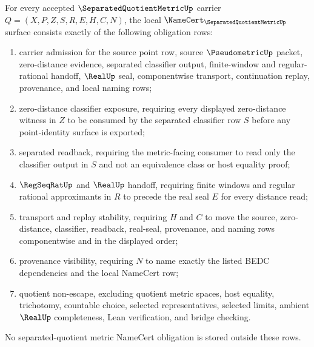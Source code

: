 \begin{theorem}
\label{thm:separated-quotient-metric-namecert-obligations}
For every accepted $\SeparatedQuotientMetricUp$ carrier $Q=(X,P,Z,S,R,E,H,C,N)$, the local $\NameCert_{\SeparatedQuotientMetricUp}$ surface consists exactly of the following obligation rows:
\begin{enumerate}
\item carrier admission for the source point row, source $\PseudometricUp$ packet, zero-distance evidence, separated classifier output, finite-window and regular-rational handoff, $\RealUp$ seal, componentwise transport, continuation replay, provenance, and local naming rows;
\item zero-distance classifier exposure, requiring every displayed zero-distance witness in $Z$ to be consumed by the separated classifier row $S$ before any point-identity surface is exported;
\item separated readback, requiring the metric-facing consumer to read only the classifier output in $S$ and not an equivalence class or host equality proof;
\item $\RegSeqRatUp$ and $\RealUp$ handoff, requiring finite windows and regular rational approximants in $R$ to precede the real seal $E$ for every distance read;
\item transport and replay stability, requiring $H$ and $C$ to move the source, zero-distance, classifier, readback, real-seal, provenance, and naming rows componentwise and in the displayed order;
\item provenance visibility, requiring $N$ to name exactly the listed BEDC dependencies and the local NameCert row;
\item quotient non-escape, excluding quotient metric spaces, host equality, trichotomy, countable choice, selected representatives, selected limits, ambient $\RealUp$ completeness, Lean verification, and bridge checking.
\end{enumerate}
No separated-quotient metric NameCert obligation is stored outside these rows.
\end{theorem}
